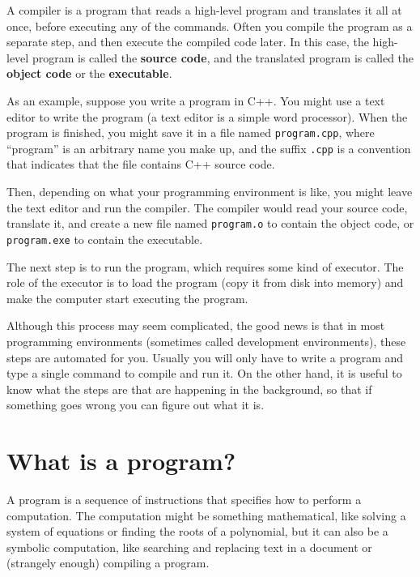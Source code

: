 \vspace{0.1in}
\centerline{}
\vspace{0.1in}

A compiler is a program that reads a high-level program and
translates it all at once, before executing any of the commands.
Often you compile the program as a separate step, and then
execute the compiled code later.  In this case, the high-level
program is called the {\bf source code}, and the translated
program is called the {\bf object code} or the {\bf executable}.

As an example, suppose you write a program in C++.  You might
use a text editor to write the program (a text editor is
a simple word processor).  When the program is finished, you
might save it in a file named {\tt program.cpp}, where ``program''
is an arbitrary name you make up, and the suffix {\tt .cpp} is
a convention that indicates that the file contains C++ source
code.

Then, depending on what your programming environment is like,
you might leave the text editor and run the compiler.  The
compiler would read your source code, translate it, and create
a new file named {\tt program.o} to contain the object code,
or {\tt program.exe} to contain the executable. 

\vspace{0.1in}
\centerline{}
\vspace{0.1in}

The next step is to run the program, which requires some kind
of executor.  The role of the executor is to load the program
(copy it from disk into memory) and make the computer start
executing the program.

Although this process may seem complicated, the good news is that in
most programming environments (sometimes called development
environments), these steps are automated for you.  Usually you will
only have to write a program and type a single command to compile and
run it.  On the other hand, it is useful to know what the steps are
that are happening in the background, so that if something goes wrong
you can figure out what it is.

\section{What is a program?}

A program is a sequence of instructions that specifies how to perform
a computation.  The computation might be something mathematical, like
solving a system of equations or finding the roots of a polynomial,
but it can also be a symbolic computation, like searching and
replacing text in a document or (strangely enough) compiling a
program.

